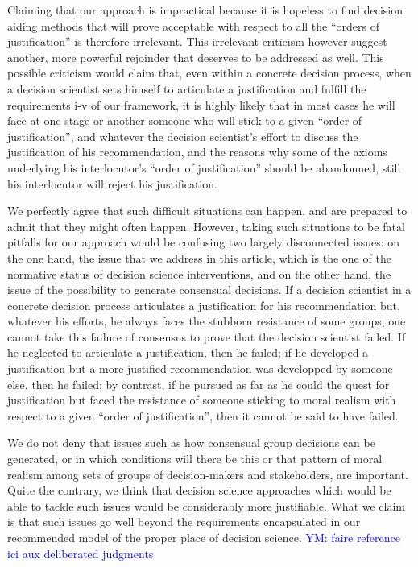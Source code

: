 \documentclass[preprint,11pt]{elsarticle}
\newcommand{\commentYM}[1]{\textcolor{blue}{YM: #1}}
\begin{document}
Claiming that our approach is impractical because it is hopeless to find decision aiding methods that will prove acceptable with respect to all the ``orders of justification'' is therefore irrelevant. This irrelevant criticism however suggest another, more powerful rejoinder that deserves to be addressed as well. This possible criticism would claim that, even within a concrete decision process, when a decision scientist sets himself to articulate a justification and fulfill the requirements i-v of our framework, it is highly likely that in most cases he will face at one stage or another someone who will stick to a given ``order of justification'', and whatever the decision scientist's effort to discuss the justification of his recommendation, and the reasons why some of the axioms underlying his interlocutor's ``order of justification'' should be abandonned, still his interlocutor will reject his justification.

We perfectly agree that such difficult situations can happen, and are prepared to admit that they might often happen. However, taking such situations to be fatal pitfalls for our approach would be confusing two largely disconnected issues: on the one hand, the issue that we address in this article, which is the one of the normative status of decision science interventions, and on the other hand, the issue of the possibility to generate consensual decisions. If a decision scientist in a concrete decision process articulates a justification for his recommendation but, whatever his efforts, he always faces the stubborn resistance of some groups, one cannot take this failure of consensus to prove that the decision scientist failed. If he neglected to articulate a justification, then he failed; if he developed a justification but a more justified recommendation was developped by someone else, then he failed; by contrast, if he pursued as far as he could the quest for justification but faced the resistance of someone sticking to moral realism with respect to a given ``order of justification'', then it cannot be said to have failed.

We do not deny that issues such as how consensual group decisions can be generated, or in which conditions will there be this or that pattern of moral realism among sets of groups of decision-makers and stakeholders, are important. Quite the contrary, we think that decision science approaches which would be able to tackle such issues would be considerably more justifiable. What we claim is that such issues go well beyond the requirements encapsulated in our recommended model of the proper place of decision science.
\commentYM{faire reference ici aux deliberated judgments}
\end{document}
